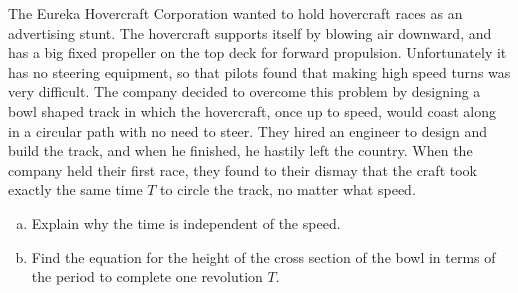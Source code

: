   The Eureka Hovercraft Corporation wanted to hold hovercraft races as an advertising stunt. The hovercraft supports itself by blowing air downward, and has a big fixed propeller on the top deck for forward propulsion. Unfortunately it has no steering equipment, so that pilots found that making high speed turns was very difficult. The company decided to overcome this problem by designing a bowl shaped track in which the hovercraft, once up to speed, would coast along in a circular path with no need to steer. They hired an engineer to design and build the track, and when he finished, he hastily left the country. When the company held their first race, they found to their dismay that the craft took exactly the same time $T$ to circle the track, no matter what speed.
  \begin{enumerate}[a)]
    \item Explain why the time is independent of the speed.
    \item Find the equation for the height of the cross section of the bowl in terms of the period to complete one revolution $T$.
  \end{enumerate}
